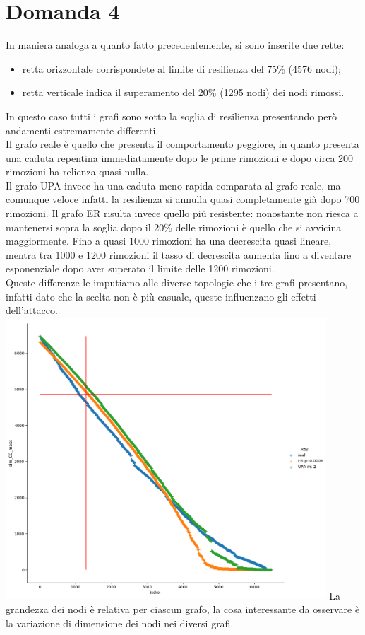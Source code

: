 \documentclass{article}
\begin{document}
\section*{Domanda 4}
In maniera analoga a quanto fatto precedentemente, si sono inserite due rette:
\begin{itemize}
	\item retta orizzontale corrispondete al limite di resilienza del 75\% (4576 nodi);
	\item retta verticale indica il superamento del 20\% (1295 nodi) dei nodi rimossi. 
\end{itemize}
In questo caso tutti i grafi sono sotto la soglia di resilienza presentando però andamenti estremamente differenti.\\
Il grafo reale è quello che presenta il comportamento peggiore, in quanto presenta una caduta repentina immediatamente dopo le prime rimozioni e dopo circa 200 rimozioni ha relienza quasi nulla.\\
Il grafo UPA invece ha una caduta meno rapida comparata al grafo reale, ma comunque veloce infatti la resilienza si annulla quasi completamente già dopo 700 rimozioni.
Il grafo ER risulta invece quello più resistente: nonostante non riesca a mantenersi sopra la soglia dopo il 20\% delle rimozioni è quello che si avvicina maggiormente. Fino a quasi 1000 rimozioni ha una decrescita quasi lineare, mentra tra 1000 e 1200 rimozioni il tasso di decrescita aumenta fino a diventare esponenziale dopo aver superato il limite delle 1200 rimozioni.\\
Queste differenze le imputiamo alle diverse topologie che i tre grafi presentano, infatti dato che la scelta non è più casuale, queste influenzano gli effetti dell'attacco.\\

\includegraphics[width=0.9\textwidth]{figures/figure_random_line}
\newpage
\noindent La grandezza dei nodi è relativa per ciascun grafo, la cosa interessante da osservare è la variazione di dimensione dei nodi nei diversi grafi.
\end{document}
